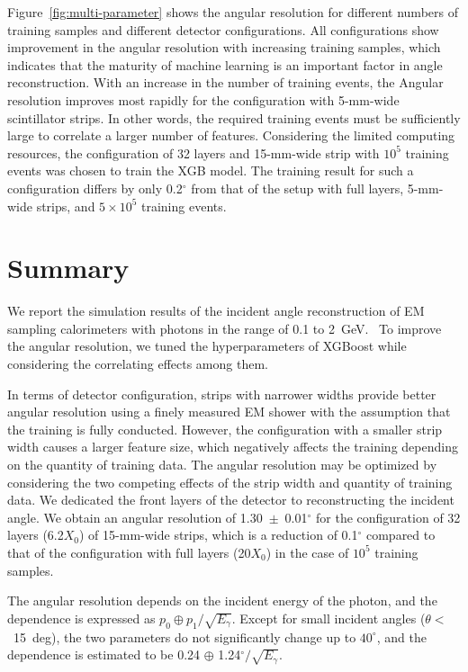 \documentclass[preprint,12pt,times,a4paper]{elsarticle}
\begin{document}
Figure~\ref{fig:multi-parameter} shows the angular resolution for different numbers of training samples and different detector configurations. All configurations show improvement in the angular resolution with increasing training samples, which indicates that the maturity of machine learning is an important factor in angle reconstruction. With an increase in the number of training events, the Angular resolution improves most rapidly for the configuration with 5-mm-wide scintillator strips. In other words, the required training events must be sufficiently large to correlate a larger number of features. Considering the limited computing resources, the configuration of 32 layers and 15-mm-wide strip with $10^{5}$ training events was chosen to train the XGB model. The training result for such a configuration differs by only 0.2$^{\circ}$ from that of the setup with full layers, 5-mm-wide strips, and $5\times10^{5}$ training events.
 
\section{Summary}
\label{sec:sum}

We report the simulation results of the incident angle reconstruction of EM sampling calorimeters with photons in the range of 0.1 to 2~GeV. ~To improve the angular resolution, we tuned the hyperparameters of XGBoost while considering the correlating effects among them.

In terms of detector configuration, strips with narrower widths provide better angular resolution using a finely measured EM shower with the assumption that the training is fully conducted. However, the configuration with a smaller strip width causes a larger feature size, which negatively affects the training depending on the quantity of training data. The angular resolution may be optimized by considering the two competing effects of the strip width and quantity of training data. We dedicated the front layers of the detector to reconstructing the incident angle. We obtain an angular resolution of 1.30~$\pm$~0.01$^{\circ}$ for the configuration of 32 layers (6.2$X_{0}$) of 15-mm-wide strips, which is a reduction of 0.1$^{\circ}$ compared to that of the configuration with full layers (20$X_{0}$) in the case of $10^{5}$ training samples. 

The angular resolution depends on the incident energy of the photon, and the dependence is expressed as $p_{0} \oplus p_{1}/\sqrt{E_{\gamma}}$. Except for small incident angles ($\theta<$~15~deg), the two parameters do not significantly change up to 
$40^{\circ}$, and the dependence is estimated to be 0.24 $\oplus$ 1.24$^{\circ}/\sqrt{E_{\gamma}}$. 
\end{document}
